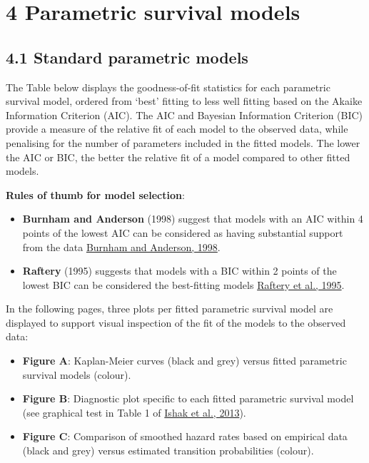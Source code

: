 \documentclass[
]{article}
\providecommand{\tightlist}{%
  \setlength{\itemsep}{0pt}\setlength{\parskip}{0pt}}
\begin{document}
\clearpage

\section{4 Parametric survival models}\label{parametric-survival-models}

\subsection{4.1 Standard parametric
models}\label{standard-parametric-models}

The Table below displays the goodness-of-fit statistics for each
parametric survival model, ordered from `best' fitting to less well
fitting based on the Akaike Information Criterion (AIC). The AIC and
Bayesian Information Criterion (BIC) provide a measure of the relative
fit of each model to the observed data, while penalising for the number
of parameters included in the fitted models. The lower the AIC or BIC,
the better the relative fit of a model compared to other fitted models.

\textbf{Rules of thumb for model selection}:

\begin{itemize}
\tightlist
\item
  \textbf{Burnham and Anderson} (1998) suggest that models with an AIC
  within 4 points of the lowest AIC can be considered as having
  substantial support from the data
  \href{https://doi.org/10.1007/978-1-4757-2917-7}{Burnham and Anderson,
  1998}.\\
\item
  \textbf{Raftery} (1995) suggests that models with a BIC within 2
  points of the lowest BIC can be considered the best-fitting models
  \href{https://doi.org/10.2307/271063}{Raftery et al., 1995}.
\end{itemize}

In the following pages, three plots per fitted parametric survival model
are displayed to support visual inspection of the fit of the models to
the observed data:

\begin{itemize}
\tightlist
\item
  \textbf{Figure A}: Kaplan-Meier curves (black and grey) versus fitted
  parametric survival models (colour).\\
\item
  \textbf{Figure B}: Diagnostic plot specific to each fitted parametric
  survival model (see graphical test in Table 1 of
  \href{https://doi.org/10.1007/s40273-013-0064-3}{Ishak et al., 2013}).
\item
  \textbf{Figure C}: Comparison of smoothed hazard rates based on
  empirical data (black and grey) versus estimated transition
  probabilities (colour).
\end{itemize}
\end{document}
